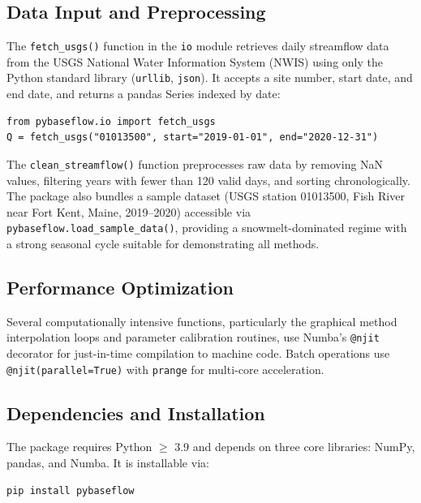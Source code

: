 \documentclass[hydrology,article,submit,pdftex,moreauthors]{Definitions/mdpi}
\begin{document}
\subsection{Data Input and Preprocessing}
\label{sec:data_input}

The \texttt{fetch\_usgs()} function in the \texttt{io} module retrieves daily streamflow data from the USGS National Water Information System (NWIS) using only the Python standard library (\texttt{urllib}, \texttt{json}). It accepts a site number, start date, and end date, and returns a pandas Series indexed by date:

\begin{lstlisting}
from pybaseflow.io import fetch_usgs
Q = fetch_usgs("01013500", start="2019-01-01", end="2020-12-31")
\end{lstlisting}

The \texttt{clean\_streamflow()} function preprocesses raw data by removing NaN values, filtering years with fewer than 120 valid days, and sorting chronologically. The package also bundles a sample dataset (USGS station 01013500, Fish River near Fort Kent, Maine, 2019--2020) accessible via \texttt{pybaseflow.load\_sample\_data()}, providing a snowmelt-dominated regime with a strong seasonal cycle suitable for demonstrating all methods.

\subsection{Performance Optimization}
\label{sec:performance}

Several computationally intensive functions, particularly the graphical method interpolation loops and parameter calibration routines, use Numba's \texttt{@njit} decorator for just-in-time compilation to machine code. Batch operations use \texttt{@njit(parallel=True)} with \texttt{prange} for multi-core acceleration.

\subsection{Dependencies and Installation}
\label{sec:dependencies}

The package requires Python $\geq$ 3.9 and depends on three core libraries: NumPy, pandas, and Numba. It is installable via:

\begin{lstlisting}[numbers=none]
pip install pybaseflow
\end{lstlisting}
\end{document}
